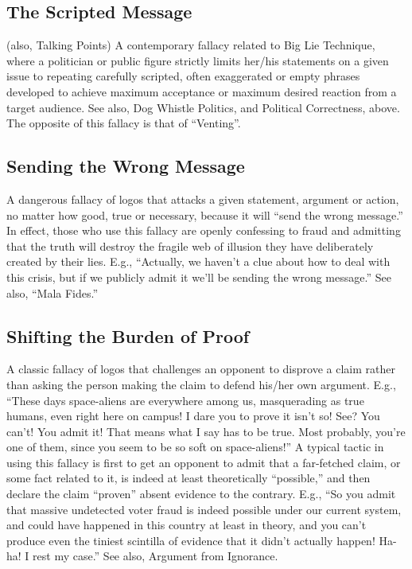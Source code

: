\documentclass[10pt,a4paper,british]{article}
\begin{document}
\begin{multicols}{2}
    \subsection{The Scripted Message} (also, Talking Points)  A contemporary fallacy related to Big Lie Technique, where a politician or public figure strictly limits her/his statements on a given issue to repeating carefully scripted, often exaggerated or empty phrases developed to achieve maximum acceptance or maximum desired reaction from a target audience. See also, Dog Whistle Politics, and Political Correctness, above. The opposite of this fallacy is that of ``Venting''.  

    \subsection{Sending the Wrong Message} A dangerous fallacy of logos that attacks a given statement, argument or action, no matter how good, true or necessary, because it will ``send the wrong message.'' In effect, those who use this fallacy are openly confessing to fraud and admitting that the truth will destroy the fragile web of illusion they have deliberately created by their lies. E.g., ``Actually, we haven't a clue about how to deal with this crisis, but if we publicly admit it we'll be sending the wrong message.'' See also, ``Mala Fides.'' 

    \subsection{Shifting the Burden of Proof}  A classic fallacy of logos that challenges an opponent to disprove a claim rather than asking the person making the claim to defend his/her own argument. E.g., ``These days space{-}aliens are everywhere among us, masquerading as true humans, even right here on campus! I dare you to prove it isn't so! See?  You can't! You admit it! That means what I say has to be true. Most probably, you're one of them, since you seem to be so soft on space{-}aliens!'' A typical tactic in using this fallacy is first to get an opponent to admit that a far{-}fetched claim, or some fact related to it, is indeed at least theoretically ``possible,'' and then declare the claim ``proven'' absent evidence to the contrary. E.g., ``So you admit that massive undetected voter fraud is indeed possible under our current system, and could have happened in this country at least in theory, and you can't produce even the tiniest scintilla of evidence that it didn't actually happen! Ha{-}ha! I rest my case.'' See also, Argument from Ignorance.  


\end{multicols}
\end{document}
